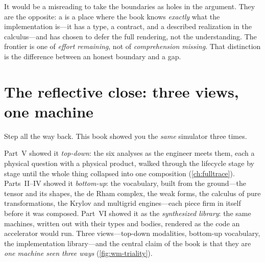 \begin{pitfall}
It would be a misreading to take the  boundaries as holes in the
argument. They are the opposite: a  is a place where the book knows
\emph{exactly} what the implementation is---it has a type, a contract, and a
described realization in the calculus---and has chosen to defer the full rendering, not
the understanding. The frontier is one of \emph{effort remaining}, not of
\emph{comprehension missing}. That distinction is the difference between an honest
boundary and a gap.
\end{pitfall}

\section{The reflective close: three views, one machine}
\label{sec:wm-reflect}

Step all the way back. This book showed you the \emph{same} simulator three times.

Part~V showed it \emph{top-down}: the six analyses as the engineer meets them, each a
physical question with a physical product, walked through the lifecycle stage by stage
until the whole thing collapsed into one composition (\cref{ch:fulltrace}). Parts~II--IV
showed it \emph{bottom-up}: the vocabulary, built from the ground---the tensor and its
shapes, the de Rham complex, the weak forms, the calculus of pure transformations, the
Krylov and multigrid engines---each piece firm in itself before it was composed.
Part~VI showed it as the \emph{synthesized library}: the same machines, written out
with their types and bodies, rendered as the code an accelerator would run. Three
views---top-down modalities, bottom-up vocabulary, the implementation
library---and the central claim of the book is that they are \emph{one machine seen
three ways} (\cref{fig:wm-triality}).

